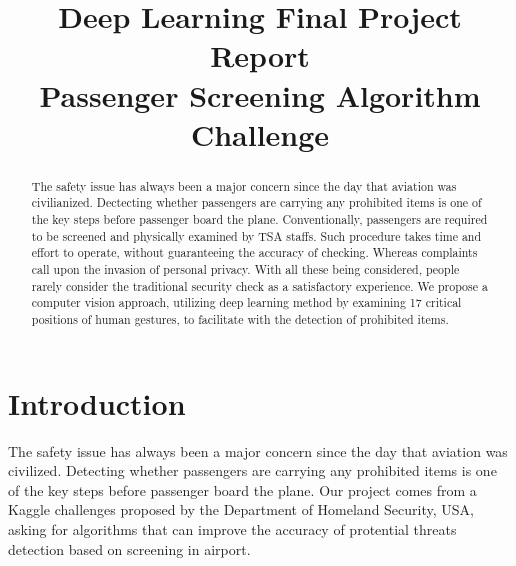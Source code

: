 \documentclass[conference,compsoc]{IEEEtran}
\begin{document}
\title{
	Deep Learning Final Project Report \\
	Passenger Screening Algorithm Challenge \\
}


\author{
\and
}

\maketitle

\begin{abstract}
The safety issue has always been a major concern since the day that aviation was civilianized. Dectecting whether passengers are carrying any prohibited items is one of the key steps before passenger board the plane. Conventionally, passengers are required to be screened and physically examined by TSA staffs. Such procedure takes time and effort to operate, without guaranteeing the accuracy of checking. Whereas complaints call upon the invasion of personal privacy. With all these being considered, people rarely consider the traditional security check as a satisfactory experience. We propose a computer vision approach, utilizing deep learning method by examining 17 critical positions of human gestures, to facilitate with the detection of prohibited items.
\end{abstract}

\section{Introduction}

The safety issue has always been a major concern since the day that aviation was civilized. Detecting whether passengers are carrying any prohibited items is one of the key steps before passenger board the plane. Our project comes from a Kaggle challenges proposed by the Department of Homeland Security, USA, asking for algorithms that can improve the accuracy of protential threats detection based on screening in airport.
\end{document}
